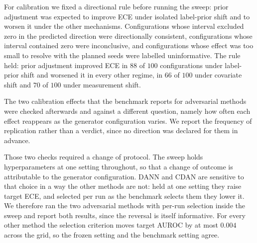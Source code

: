 
For calibration we fixed a directional rule before running the sweep: prior
adjustment was expected to improve ECE under isolated label-prior shift and to
worsen it under the other mechanisms. Configurations whose interval excluded
zero in the predicted direction were directionally consistent, configurations
whose interval contained zero were inconclusive, and configurations whose effect
was too small to resolve with the planned seeds were labelled uninformative. The
rule held: prior adjustment improved ECE in $88$ of $100$ configurations under
label-prior shift and worsened it in every other regime, in $66$ of $100$ under
covariate shift and $70$ of $100$ under measurement shift.

The two calibration effects that the benchmark reports for adversarial methods
were checked afterwards and against a different question, namely how often each
effect reappears as the generator configuration varies. We report the frequency
of replication rather than a verdict, since no direction was declared for them
in advance.

Those two checks required a change of protocol. The sweep holds hyperparameters
at one setting throughout, so that a change of outcome is attributable to the
generator configuration. DANN and CDAN are sensitive to that choice in a way the
other methods are not: held at one setting they raise target ECE, and selected
per run as the benchmark selects them they lower it. We therefore ran the two
adversarial methods with per-run selection inside the sweep and report both
results, since the reversal is itself informative. For every other method the
selection criterion moves target AUROC by at most $0.004$ across the grid, so
the frozen setting and the benchmark setting agree.

